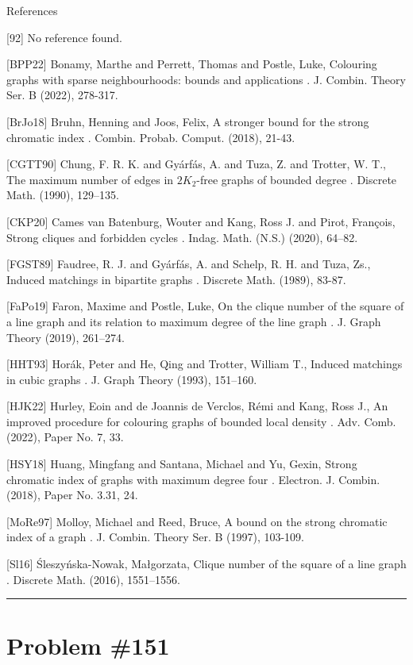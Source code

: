 \documentclass{article}
\begin{document}
References

[92] No reference found.


[BPP22] Bonamy, Marthe and Perrett, Thomas and Postle, Luke, Colouring graphs with sparse neighbourhoods: bounds and applications . J. Combin. Theory Ser. B (2022), 278-317.

[BrJo18] Bruhn, Henning and Joos, Felix, A stronger bound for the strong chromatic index . Combin. Probab. Comput. (2018), 21-43.

[CGTT90] Chung, F. R. K. and Gy\'{a}rf\'{a}s, A. and Tuza, Z. and Trotter, W. T., The maximum number of edges in {$2K_2$}-free graphs of bounded degree . Discrete Math. (1990), 129--135.

[CKP20] Cames van Batenburg, Wouter and Kang, Ross J. and Pirot, Fran\c cois, Strong cliques and forbidden cycles . Indag. Math. (N.S.) (2020), 64--82.

[FGST89] Faudree, R. J. and Gy\'{a}rf\'{a}s, A. and Schelp, R. H. and Tuza, Zs., Induced matchings in bipartite graphs . Discrete Math. (1989), 83-87.

[FaPo19] Faron, Maxime and Postle, Luke, On the clique number of the square of a line graph and its relation to maximum degree of the line graph . J. Graph Theory (2019), 261--274.

[HHT93] Hor\'{a}k, Peter and He, Qing and Trotter, William T., Induced matchings in cubic graphs . J. Graph Theory (1993), 151--160.

[HJK22] Hurley, Eoin and de Joannis de Verclos, R\'{e}mi and Kang, Ross J., An improved procedure for colouring graphs of bounded local density . Adv. Comb. (2022), Paper No. 7, 33.

[HSY18] Huang, Mingfang and Santana, Michael and Yu, Gexin, Strong chromatic index of graphs with maximum degree four . Electron. J. Combin. (2018), Paper No. 3.31, 24.

[MoRe97] Molloy, Michael and Reed, Bruce, A bound on the strong chromatic index of a graph . J. Combin. Theory Ser. B (1997), 103-109.

[Sl16] \'Sleszy\'nska-Nowak, Ma\l gorzata, Clique number of the square of a line graph . Discrete Math. (2016), 1551--1556.

\noindent\rule{\linewidth}{0.4pt}


\section{Problem \#151}
\label{prob:151}
\end{document}
